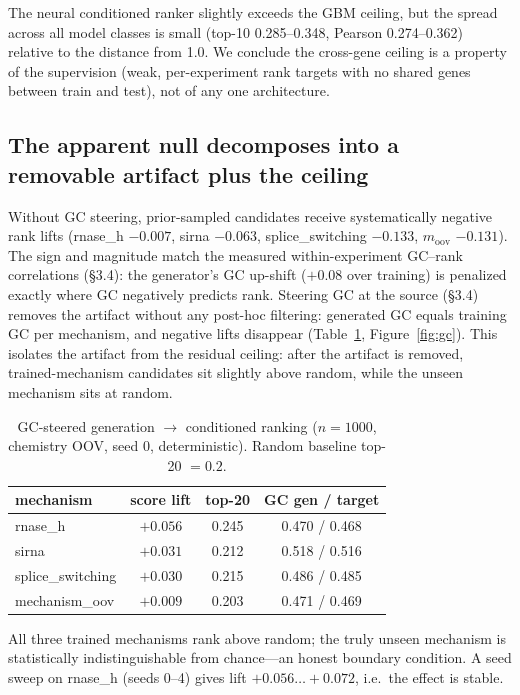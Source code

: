 \documentclass{article} %
\begin{document}
The neural conditioned ranker slightly exceeds the GBM ceiling, but the spread across all model classes is small (top-10 0.285--0.348, Pearson 0.274--0.362) relative to the distance from 1.0. We conclude the cross-gene ceiling is a property of the supervision (weak, per-experiment rank targets with no shared genes between train and test), not of any one architecture.

\subsection{The apparent null decomposes into a removable artifact plus the ceiling}

Without GC steering, prior-sampled candidates receive systematically negative rank lifts (rnase\_h $-0.007$, sirna $-0.063$, splice\_switching $-0.133$, $m_{\mathrm{oov}}$ $-0.131$). The sign and magnitude match the measured within-experiment GC--rank correlations (\S3.4): the generator's GC up-shift ($+0.08$ over training) is penalized exactly where GC negatively predicts rank. Steering GC at the source (\S3.4) removes the artifact without any post-hoc filtering: generated GC equals training GC per mechanism, and negative lifts disappear (Table~\ref{tab:gc}, Figure~\ref{fig:gc}). This isolates the artifact from the residual ceiling: after the artifact is removed, trained-mechanism candidates sit slightly above random, while the unseen mechanism sits at random.

\begin{table}[t]
\centering
\begin{tabular}{lccc}
\toprule
mechanism & score lift & top-20 & GC gen / target \\
\midrule
rnase\_h & $+0.056$ & 0.245 & 0.470 / 0.468 \\
sirna & $+0.031$ & 0.212 & 0.518 / 0.516 \\
splice\_switching & $+0.030$ & 0.215 & 0.486 / 0.485 \\
mechanism\_oov & $+0.009$ & 0.203 & 0.471 / 0.469 \\
\bottomrule
\end{tabular}
\caption{GC-steered generation $\rightarrow$ conditioned ranking ($n{=}1000$, chemistry OOV, seed 0, deterministic). Random baseline top-20 $= 0.2$.}
\label{tab:gc}
\end{table}

All three trained mechanisms rank above random; the truly unseen mechanism is statistically indistinguishable from chance---an honest boundary condition. A seed sweep on rnase\_h (seeds 0--4) gives lift $+0.056\ldots+0.072$, i.e.\ the effect is stable.
\end{document}
